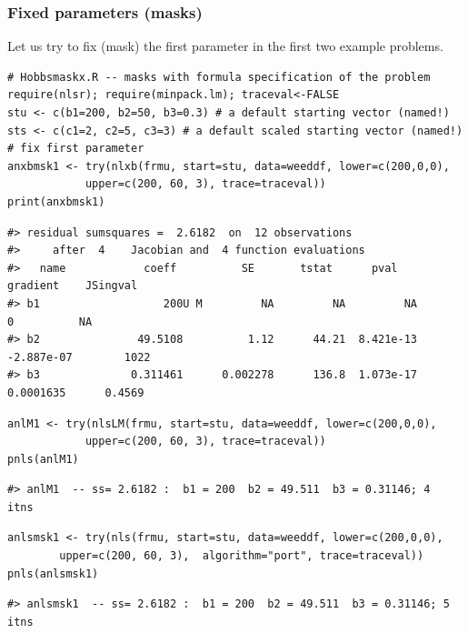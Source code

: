 \subsubsection{Fixed parameters (masks)}\label{fixed-parameters-masks}

Let us try to fix (mask) the first parameter in the first two example problems.

\begin{verbatim}
# Hobbsmaskx.R -- masks with formula specification of the problem
require(nlsr); require(minpack.lm); traceval<-FALSE
stu <- c(b1=200, b2=50, b3=0.3) # a default starting vector (named!)
sts <- c(c1=2, c2=5, c3=3) # a default scaled starting vector (named!)
# fix first parameter
anxbmsk1 <- try(nlxb(frmu, start=stu, data=weeddf, lower=c(200,0,0), 
            upper=c(200, 60, 3), trace=traceval))
print(anxbmsk1)
\end{verbatim}

\begin{verbatim}
#> residual sumsquares =  2.6182  on  12 observations
#>     after  4    Jacobian and  4 function evaluations
#>   name            coeff          SE       tstat      pval      gradient    JSingval   
#> b1                   200U M         NA         NA         NA           0          NA  
#> b2               49.5108          1.12      44.21  8.421e-13  -2.887e-07        1022  
#> b3              0.311461      0.002278      136.8  1.073e-17   0.0001635      0.4569
\end{verbatim}

\begin{verbatim}
anlM1 <- try(nlsLM(frmu, start=stu, data=weeddf, lower=c(200,0,0), 
            upper=c(200, 60, 3), trace=traceval))
pnls(anlM1)
\end{verbatim}

\begin{verbatim}
#> anlM1  -- ss= 2.6182 :  b1 = 200  b2 = 49.511  b3 = 0.31146; 4  itns
\end{verbatim}

\begin{verbatim}
anlsmsk1 <- try(nls(frmu, start=stu, data=weeddf, lower=c(200,0,0), 
        upper=c(200, 60, 3),  algorithm="port", trace=traceval))
pnls(anlsmsk1)
\end{verbatim}

\begin{verbatim}
#> anlsmsk1  -- ss= 2.6182 :  b1 = 200  b2 = 49.511  b3 = 0.31146; 5  itns
\end{verbatim}

